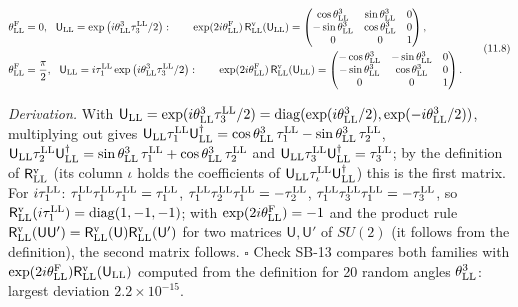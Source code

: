 \documentclass[
  10pt,
]{article}
\begin{document}
\[\begin{aligned}&\theta^{\rm F}_{\rm LL}=0,\ \ \mathsf U_{\rm LL}=\exp\big(i\theta^3_{\rm LL}\tau^{\rm LL}_3/2\big):\qquad\exp(2i\theta^{\rm F}_{\rm LL})\,\mathsf R^{\rm v}_{\rm LL}(\mathsf U_{\rm LL})=\begin{pmatrix}\cos\theta^3_{\rm LL}&\sin\theta^3_{\rm LL}&0\\-\sin\theta^3_{\rm LL}&\cos\theta^3_{\rm LL}&0\\0&0&1\end{pmatrix},\\&\theta^{\rm F}_{\rm LL}=\frac\pi2,\ \ \mathsf U_{\rm LL}=i\tau^{\rm LL}_1\exp\big(i\theta^3_{\rm LL}\tau^{\rm LL}_3/2\big):\qquad\exp(2i\theta^{\rm F}_{\rm LL})\,\mathsf R^{\rm v}_{\rm LL}(\mathsf U_{\rm LL})=\begin{pmatrix}-\cos\theta^3_{\rm LL}&-\sin\theta^3_{\rm LL}&0\\-\sin\theta^3_{\rm LL}&\cos\theta^3_{\rm LL}&0\\0&0&1\end{pmatrix}.\end{aligned}\tag{11.8}\]

\emph{Derivation.} With
\(\mathsf U_{\rm LL}=\exp(i\theta^3_{\rm LL}\tau^{\rm LL}_3/2)=\mathrm{diag}(\exp(i\theta^3_{\rm LL}/2),\exp(-i\theta^3_{\rm LL}/2))\),
multiplying out gives
\(\mathsf U_{\rm LL}\tau^{\rm LL}_1\mathsf U_{\rm LL}^\dagger=\cos\theta^3_{\rm LL}\,\tau^{\rm LL}_1-\sin\theta^3_{\rm LL}\,\tau^{\rm LL}_2\),
\(\mathsf U_{\rm LL}\tau^{\rm LL}_2\mathsf U_{\rm LL}^\dagger=\sin\theta^3_{\rm LL}\,\tau^{\rm LL}_1+\cos\theta^3_{\rm LL}\,\tau^{\rm LL}_2\)
and
\(\mathsf U_{\rm LL}\tau^{\rm LL}_3\mathsf U_{\rm LL}^\dagger=\tau^{\rm LL}_3\);
by the definition of \(\mathsf R^{\rm v}_{\rm LL}\) (its column
\(\iota\) holds the coefficients of
\(\mathsf U_{\rm LL}\tau^{\rm LL}_\iota\mathsf U_{\rm LL}^\dagger\))
this is the first matrix. For \(i\tau^{\rm LL}_1\):
\(\tau^{\rm LL}_1\tau^{\rm LL}_1\tau^{\rm LL}_1=\tau^{\rm LL}_1\),
\(\tau^{\rm LL}_1\tau^{\rm LL}_2\tau^{\rm LL}_1=-\tau^{\rm LL}_2\),
\(\tau^{\rm LL}_1\tau^{\rm LL}_3\tau^{\rm LL}_1=-\tau^{\rm LL}_3\), so
\(\mathsf R^{\rm v}_{\rm LL}(i\tau^{\rm LL}_1)=\mathrm{diag}(1,-1,-1)\);
with \(\exp(2i\theta^{\rm F}_{\rm LL})=-1\) and the product rule
\(\mathsf R^{\rm v}_{\rm LL}(\mathsf U\mathsf U')=\mathsf R^{\rm v}_{\rm LL}(\mathsf U)\mathsf R^{\rm v}_{\rm LL}(\mathsf U')\)
for two matrices \(\mathsf U,\mathsf U'\) of \(SU(2)\) (it follows from
the definition), the second matrix follows. \(\square\) Check SB-13
compares both families with
\(\exp(2i\theta^{\rm F}_{\rm LL})\mathsf R^{\rm v}_{\rm LL}(\mathsf U_{\rm LL})\)
computed from the definition for 20 random angles \(\theta^3_{\rm LL}\):
largest deviation \(2.2\times10^{-15}\).
\end{document}
